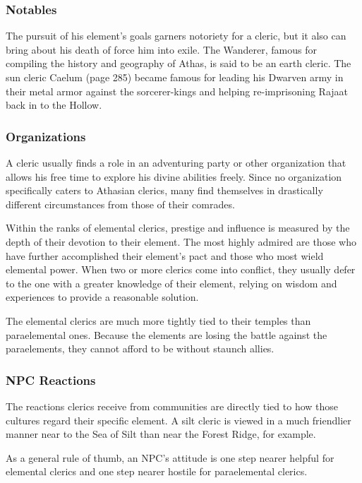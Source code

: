 \subsubsection{Notables}

The pursuit of his element's goals garners notoriety for a cleric, but it also can bring about his death of force him into exile. The Wanderer, famous for compiling the history and geography of Athas, is said to be an earth cleric. The sun cleric Caelum (page 285) became famous for leading his Dwarven army in their metal armor against the sorcerer-kings and helping re-imprisoning Rajaat back in to the Hollow.

\subsubsection{Organizations}

A cleric usually finds a role in an adventuring party or other organization that allows his free time to explore his divine abilities freely. Since no organization specifically caters to Athasian clerics, many find themselves in drastically different circumstances from those of their comrades.

Within the ranks of elemental clerics, prestige and influence is measured by the depth of their devotion to their element. The most highly admired are those who have further accomplished their element's pact and those who most wield elemental power. When two or more clerics come into conflict, they usually defer to the one with a greater knowledge of their element, relying on wisdom and experiences to provide a reasonable solution.

The elemental clerics are much more tightly tied to their temples than paraelemental ones. Because the elements are losing the battle against the paraelements, they cannot afford to be without staunch allies.

\subsubsection{NPC Reactions}

The reactions clerics receive from communities are directly tied to how those cultures regard their specific element. A silt cleric is viewed in a much friendlier manner near to the Sea of Silt than near the Forest Ridge, for example.

As a general rule of thumb, an NPC's attitude is one step nearer helpful for elemental clerics and one step nearer hostile for paraelemental clerics.

